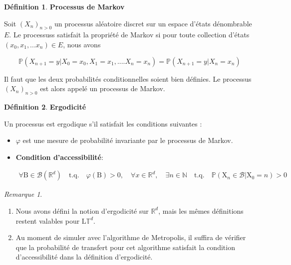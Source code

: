 \documentclass[11pt]{article}
\theoremstyle{definition}
\newtheorem{definition}{Définition}[section]
\theoremstyle{remark}
\newtheorem*{remark}{Remarque}
\begin{document}
\theoremstyle{definition}

\begin{definition}{\textbf{Processus de Markov}}

Soit $(X_n)_{n >0}$ un processus aléatoire discret sur un espace d'états dénombrable $E$. Le processuss satisfait la propriété de Markov si pour toute collection d'états $(x_0, x_1, ... x_n) \in E$, nous avons 

\begin{equation} 
\mathbb{P}(X_{n+1} = y | X_0 = x_0, X_1 = x_1,....X_n = x_n) = \mathbb{P}(X_{n+1} = y | X_n = x_n)
\end{equation}

Il faut que les deux probabilités conditionnelles soient bien définies. Le processus $(X_n)_{n>0} $ est alors appelé un processus de Markov.

\end{definition}

\begin{definition}{\textbf{Ergodicité}}

Un processus est ergodique s'il satisfait les conditions suivantes :

\begin{itemize}

\item 

$\varphi$ est une mesure de probabilité invariante par le processus de Markov. 

\item 

\textbf{Condition d'accessibilité}: 

\begin{align}
\forall \mathrm{B} \in \mathcal{B}(\mathbb{R}^d)\quad \mathrm{t.q.}\quad \varphi(\mathrm{B})>0, \quad \forall x\in\mathbb{R}^d, \quad \exists n\in\mathbb{N} \quad \mathrm{t.q.}\quad \mathbb{P}(\mathrm{X}_n \in \mathcal{B} | \mathrm{X}_0 =n ) > 0 
\end{align}
\end{itemize}

\end{definition}

\begin{remark}
\begin{enumerate}
\item 
Nous avons défini la notion d'ergodicité sur $\mathbb{R}^d$, mais les mêmes définitions restent valables pour $\mathrm{L}\mathbb{T}^d$.
\item 
Au moment de simuler avec l'algorithme de Metropolis, il suffira de vérifier que la probabilité de transfert pour cet algorithme satisfait la condition d'accessibilité dans la définition d'ergodicité.

\end{enumerate}
\end{remark}
\end{document}
